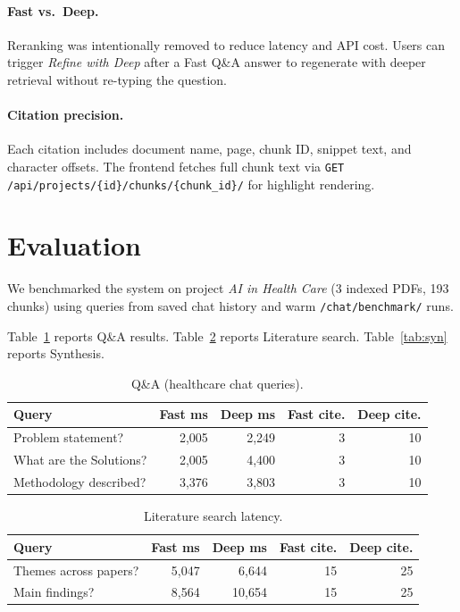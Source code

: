 \documentclass[sigplan,review,anonymous]{acmart}
\begin{document}
\paragraph{Fast vs.\ Deep.}
Reranking was intentionally removed to reduce latency and API cost.
Users can trigger \emph{Refine with Deep} after a Fast Q\&A answer to regenerate with
deeper retrieval without re-typing the question.

\paragraph{Citation precision.}
Each citation includes document name, page, chunk ID, snippet text, and character offsets.
The frontend fetches full chunk text via
\texttt{GET /api/projects/\{id\}/chunks/\{chunk\_id\}/} for highlight rendering.

\section{Evaluation}
\label{sec:eval}

We benchmarked the system on project \emph{AI in Health Care} (3 indexed PDFs, 193 chunks)
using queries from saved chat history and warm \texttt{/chat/benchmark/} runs.

Table~\ref{tab:qa} reports Q\&A results.
Table~\ref{tab:lit} reports Literature search.
Table~\ref{tab:syn} reports Synthesis.

\begin{table}[t]
  \caption{Q\&A (healthcare chat queries).}
  \label{tab:qa}
  \small
  \begin{tabular}{@{}lrrrr@{}}
    \toprule
    \textbf{Query} & \textbf{Fast ms} & \textbf{Deep ms} & \textbf{Fast cite.} & \textbf{Deep cite.} \\
    \midrule
    Problem statement? & 2{,}005 & 2{,}249 & 3 & 10 \\
    What are the Solutions? & 2{,}005 & 4{,}400 & 3 & 10 \\
    Methodology described? & 3{,}376 & 3{,}803 & 3 & 10 \\
    \bottomrule
  \end{tabular}
\end{table}

\begin{table}[t]
  \caption{Literature search latency.}
  \label{tab:lit}
  \small
  \begin{tabular}{@{}lrrrr@{}}
    \toprule
    \textbf{Query} & \textbf{Fast ms} & \textbf{Deep ms} & \textbf{Fast cite.} & \textbf{Deep cite.} \\
    \midrule
    Themes across papers? & 5{,}047 & 6{,}644 & 15 & 25 \\
    Main findings? & 8{,}564 & 10{,}654 & 15 & 25 \\
    \bottomrule
  \end{tabular}
\end{table}
\end{document}
